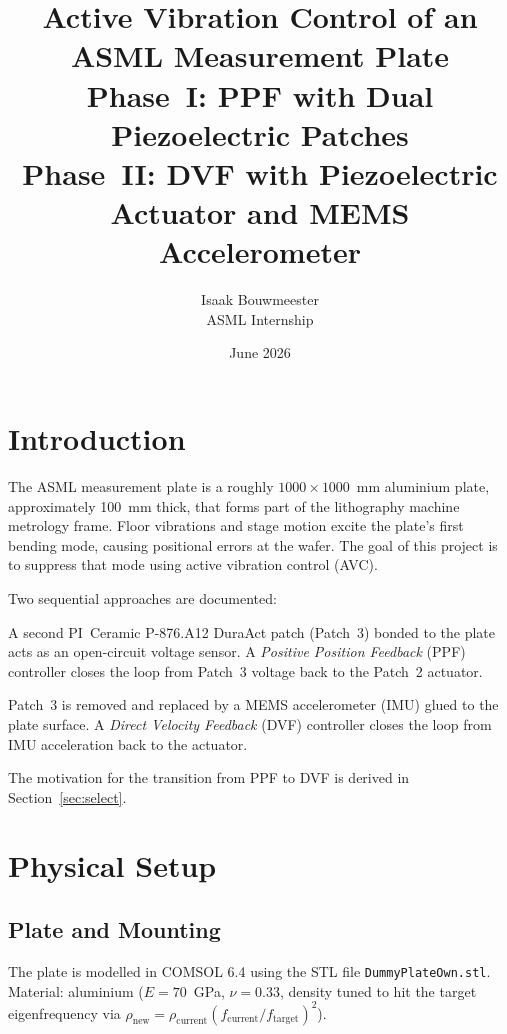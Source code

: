 \documentclass[12pt,a4paper]{article}
\title{\textbf{Active Vibration Control of an ASML Measurement Plate}\\[4pt]
       \large Phase~I: PPF with Dual Piezoelectric Patches\\
       Phase~II: DVF with Piezoelectric Actuator and MEMS Accelerometer}
\author{Isaak Bouwmeester \\ ASML Internship}
\date{June 2026}
\begin{document}
\maketitle
\tableofcontents
\newpage

\section{Introduction}
\label{sec:intro}

The ASML measurement plate is a roughly $1000 \times 1000$~mm aluminium plate,
approximately 100~mm thick, that forms part of the lithography machine metrology
frame. Floor vibrations and stage motion excite the plate's first bending mode,
causing positional errors at the wafer. The goal of this project is to suppress
that mode using active vibration control (AVC).

Two sequential approaches are documented:

\begin{description}[leftmargin=2cm, labelwidth=1.8cm]
  \item[Phase I] A second PI~Ceramic P-876.A12 DuraAct patch (Patch~3) bonded to
        the plate acts as an open-circuit voltage sensor.  A
        \emph{Positive Position Feedback} (PPF) controller closes the loop from
        Patch~3 voltage back to the Patch~2 actuator.
  \item[Phase II] Patch~3 is removed and replaced by a MEMS accelerometer (IMU)
        glued to the plate surface.  A \emph{Direct Velocity Feedback} (DVF)
        controller closes the loop from IMU acceleration back to the actuator.
\end{description}

The motivation for the transition from PPF to DVF is derived in
Section~\ref{sec:select}.

\section{Physical Setup}
\label{sec:setup}

\subsection{Plate and Mounting}

The plate is modelled in COMSOL 6.4 using the STL file
\texttt{DummyPlateOwn.stl}.  Material: aluminium
($E = 70$~GPa, $\nu = 0.33$, density tuned to hit the target eigenfrequency via
$\rho_\text{new} = \rho_\text{current}(f_\text{current}/f_\text{target})^{2}$).
\end{document}

